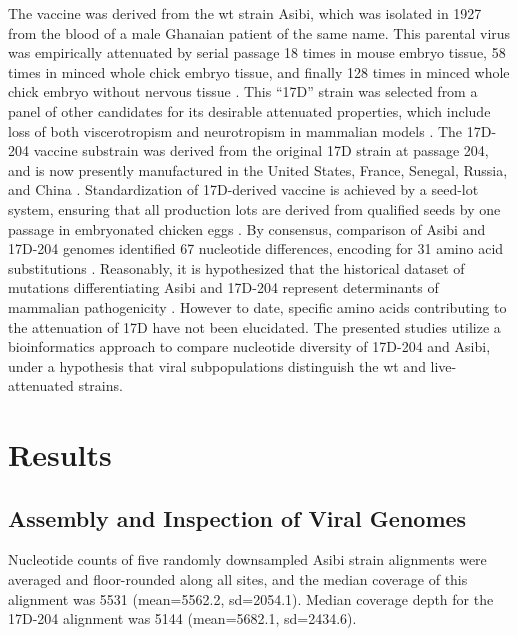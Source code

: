 The vaccine was derived from the \gls{wt} strain Asibi, which was isolated in 1927 from the blood of a male Ghanaian patient of the same name. This parental virus was empirically attenuated by serial passage 18 times in mouse embryo tissue, 58 times in minced whole chick embryo tissue, and finally 128 times in minced whole chick embryo without nervous tissue \parencite{Lloyd:1936vn,Theiler:1937wy}. This ``17D'' strain was selected from a panel of other candidates for its desirable attenuated properties, which include loss of both viscerotropism and neurotropism in mammalian models \parencite{Monath:2013cu}. The 17D-204 vaccine substrain was derived from the original 17D strain at passage 204, and is now presently manufactured in the United States, France, Senegal, Russia, and China \parencite[278]{WorldHealthOrganization:2010wo}. Standardization of 17D-derived vaccine is achieved by a seed-lot system, ensuring that all production lots are derived from qualified seeds by one passage in embryonated chicken eggs \parencite[251]{WorldHealthOrganization:2010wo}. By consensus, comparison of Asibi and 17D-204 genomes identified 67 nucleotide differences, encoding for 31 amino acid substitutions \parencite{Hahn:1987tw,Dupuy:1989wb}. Reasonably, it is hypothesized that the historical dataset of mutations differentiating Asibi and 17D-204 represent determinants of mammalian pathogenicity \parencite{Lee:2008gd}. However to date, specific amino acids contributing to the attenuation of 17D have not been elucidated. The presented studies utilize a bioinformatics approach to compare nucleotide diversity of 17D-204 and Asibi, under a hypothesis that viral subpopulations distinguish the \gls{wt} and live-attenuated strains. 
\section{Results}
\subsection{Assembly and Inspection of Viral Genomes} 
Nucleotide counts of five randomly downsampled Asibi strain alignments were averaged and floor-rounded along all sites, and the median coverage of this alignment was 5531 (mean=5562.2, \gls{sd}=2054.1). Median coverage depth for the 17D-204 alignment was 5144 (mean=5682.1, \gls{sd}=2434.6). 
